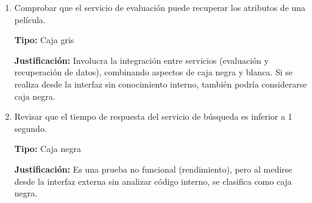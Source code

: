 \begin{solucion}
\begin{enumerate}
        \item Comprobar que el servicio de evaluación puede recuperar los atributos de una película.

        \textbf{Tipo:} Caja gris

        \textbf{Justificación:} Involucra la integración entre servicios (evaluación y recuperación de datos), combinando aspectos de caja negra y blanca.
        Si se realiza desde la interfaz sin conocimiento interno, también podría considerarse caja negra.

        \item Revisar que el tiempo de respuesta del servicio de búsqueda es inferior a 1 segundo.

        \textbf{Tipo:} Caja negra

        \textbf{Justificación:} Es una prueba no funcional (rendimiento), pero al medirse desde la interfaz externa sin analizar código interno, se clasifica como caja negra.
    \end{enumerate}

\end{solucion}